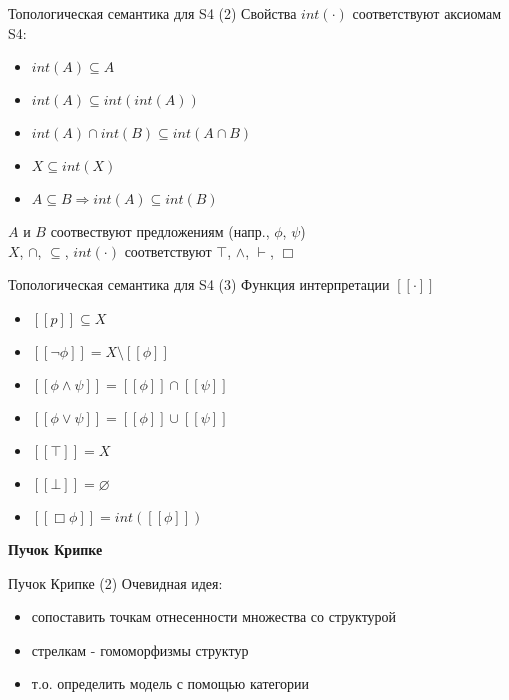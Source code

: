 \documentclass{beamer}
\begin{document}
\begin{frame}{Топологическая семантика для S4 (2)}
Свойства $int(\cdot)$ соответствуют аксиомам S4:\\
\bigskip
\begin{itemize}
	\item $int(A) \subseteq A$
	\item $int(A) \subseteq int(int(A))$
	\item $int(A) \cap int(B) \subseteq int(A \cap B)$
	\item $X \subseteq int(X)$
	\item $A \subseteq B \Longrightarrow int(A) \subseteq int(B)$
\end{itemize}
\bigskip
\begin{footnotesize}
$A$ и $B$ соотвествуют предложениям (напр., $\phi$, $\psi$)\\
$X$, $\cap$, $\subseteq$, $int(\cdot)$ соответствуют $\top$, $\wedge$, $\vdash$, $\Box$
\end{footnotesize}
\end{frame}

\begin{frame}{Топологическая семантика для S4 (3)}
Функция интерпретации $[ \! [ \cdot ] \! ]$\\
\bigskip
\begin{itemize}
	\item $[ \! [ p ] \! ] \subseteq X$\\
	\item $[ \! [ \neg \phi ] \! ] = X \setminus [ \! [ \phi ] \! ]$
	\item $[ \! [ \phi \wedge \psi ] \! ] = [ \! [ \phi ] \! ] \cap [ \! [ \psi ] \! ]$
	\item $[ \! [ \phi \vee \psi ] \! ] = [ \! [ \phi ] \! ] \cup [ \! [ \psi ] \! ]$
	\item $[ \! [ \top ] \! ] = X$
	\item $[ \! [ \bot ] \! ] = \varnothing$
	\item $[ \! [ \Box \phi ] \! ] = int([ \! [ \phi ] \! ])$
\end{itemize}
\end{frame}

\begin{frame}{}
\begin{center}
	\textbf{Пучок Крипке}
\end{center}
\end{frame}



\begin{frame}{Пучок Крипке (2)}
Очевидная идея:\\
\bigskip
\begin{itemize}
	\item сопоставить точкам отнесенности множества со структурой
	\item стрелкам - гомоморфизмы структур
	\item т.о. определить модель с помощью категории
\end{itemize}
\end{frame}
\end{document}
